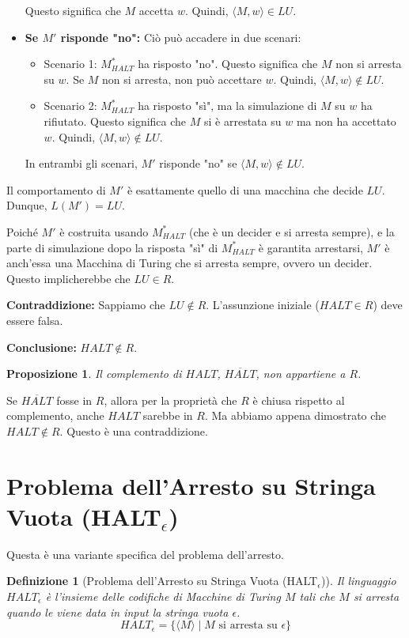 \documentclass[a4paper]{article}
\makeatletter
\newtheorem{definition}{Definizione}[section] %
\newtheorem{proposition}{Proposizione}[section]
\renewenvironment{proof}[1][\proofname]{\par
  \pushQED{\qed}%
  \normalfont \topsep6\p@\@plus6\p@\relax
  \trivlist
  \item[\hskip\labelsep
        \bfseries
    #1\@addpunct{.}]\ignorespaces
}{%
  \popQED\endtrivlist\@endpefalse
}
\makeatother
\begin{document}
\begin{proof}
\begin{itemize}
    Questo significa che $M$ accetta $w$. Quindi, $\langle M, w \rangle \in LU$.
    \item \textbf{Se $M'$ risponde "no":}
    Ciò può accadere in due scenari:
    \begin{itemize}
        \item Scenario 1: $M_{HALT}^*$ ha risposto "no". Questo significa che $M$ non si arresta su $w$. Se $M$ non si arresta, non può accettare $w$. Quindi, $\langle M, w \rangle \notin LU$.
        \item Scenario 2: $M_{HALT}^*$ ha risposto "sì", ma la simulazione di $M$ su $w$ ha rifiutato. Questo significa che $M$ si è arrestata su $w$ ma non ha accettato $w$. Quindi, $\langle M, w \rangle \notin LU$.
    \end{itemize}
    In entrambi gli scenari, $M'$ risponde "no" se $\langle M, w \rangle \notin LU$.
\end{itemize}
Il comportamento di $M'$ è esattamente quello di una macchina che decide $LU$. Dunque, $L(M') = LU$.

Poiché $M'$ è costruita usando $M_{HALT}^*$ (che è un decider e si arresta sempre), e la parte di simulazione dopo la risposta "sì" di $M_{HALT}^*$ è garantita arrestarsi, $M'$ è anch'essa una Macchina di Turing che si arresta sempre, ovvero un decider.
Questo implicherebbe che $LU \in R$.

\textbf{Contraddizione:} Sappiamo che $LU \notin R$.
L'assunzione iniziale ($HALT \in R$) deve essere falsa.

\textbf{Conclusione:} $HALT \notin R$.
\end{proof}

\begin{proposition}
Il complemento di $HALT$, $\overline{HALT}$, non appartiene a $R$.
\end{proposition}
\begin{proof}
Se $\overline{HALT}$ fosse in $R$, allora per la proprietà che $R$ è chiusa rispetto al complemento, anche $HALT$ sarebbe in $R$. Ma abbiamo appena dimostrato che $HALT \notin R$. Questo è una contraddizione.
\end{proof}

\section{Problema dell'Arresto su Stringa Vuota (HALT$_\epsilon$)}
Questa è una variante specifica del problema dell'arresto.
\begin{definition}[Problema dell'Arresto su Stringa Vuota (HALT$_\epsilon$)]
Il linguaggio $HALT_\epsilon$ è l'insieme delle codifiche di Macchine di Turing $M$ tali che $M$ si arresta quando le viene data in input la stringa vuota $\epsilon$.
\[ HALT_\epsilon = \{ \langle M \rangle \mid M \text{ si arresta su } \epsilon \} \]
\end{definition}
\end{document}
